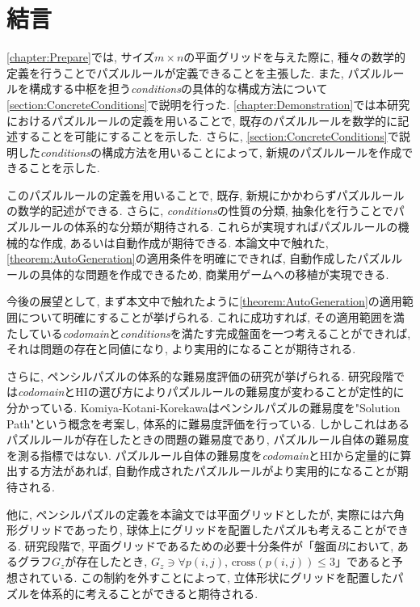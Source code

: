 \chapter{結言}
\cref{chapter:Prepare}では, サイズ$m\times n$の平面グリッドを与えた際に, 種々の数学的定義を行うことでパズルルールが定義できることを主張した. また, パズルルールを構成する中枢を担う\textit{conditions}の具体的な構成方法について\cref{section:ConcreteConditions}で説明を行った. \cref{chapter:Demonstration}では本研究におけるパズルルールの定義を用いることで, 既存のパズルルールを数学的に記述することを可能にすることを示した. さらに, \cref{section:ConcreteConditions}で説明した\textit{conditions}の構成方法を用いることによって, 新規のパズルルールを作成できることを示した.

このパズルルールの定義を用いることで, 既存, 新規にかかわらずパズルルールの数学的記述ができる. さらに, \textit{conditions}の性質の分類, 抽象化を行うことでパズルルールの体系的な分類が期待される. これらが実現すればパズルルールの機械的な作成, あるいは自動作成が期待できる. 本論文中で触れた, \cref{theorem:AutoGeneration}の適用条件を明確にできれば, 自動作成したパズルルールの具体的な問題を作成できるため, 商業用ゲームへの移植が実現できる.

今後の展望として, まず本文中で触れたように\cref{theorem:AutoGeneration}の適用範囲について明確にすることが挙げられる. これに成功すれば, その適用範囲を満たしている\textit{codomain}と\textit{conditions}を満たす完成盤面を一つ考えることができれば, それは問題の存在と同値になり, より実用的になることが期待される.

さらに, ペンシルパズルの体系的な難易度評価の研究が挙げられる. 研究段階では\textit{codomain}とHIの選び方によりパズルルールの難易度が変わることが定性的に分かっている. Komiya-Kotani-Korekawa\cite{Komiya2010}はペンシルパズルの難易度を"Solution Path"という概念を考案し, 体系的に難易度評価を行っている. しかしこれはあるパズルルールが存在したときの問題の難易度であり, パズルルール自体の難易度を測る指標ではない. パズルルール自体の難易度を\textit{codomain}とHIから定量的に算出する方法があれば, 自動作成されたパズルルールがより実用的になることが期待される.

他に, ペンシルパズルの定義を本論文では平面グリッドとしたが, 実際には六角形グリッドであったり, 球体上にグリッドを配置したパズルも考えることができる. 研究段階で, 平面グリッドであるための必要十分条件が「盤面$B$において, あるグラフ$G_z$が存在したとき, $G_z \ni \forall p(i,j)$, $\text{cross}(p(i,j))\le3$」であると予想されている. この制約を外すことによって, 立体形状にグリッドを配置したパズルを体系的に考えることができると期待される.
